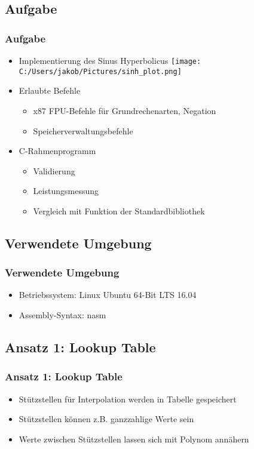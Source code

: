 	\frame{\titlepage}
	\begin{frame}
		\tableofcontents
	\end{frame}
	\begin{frame}
		\section{Aufgabe}
		\frametitle{Aufgabe}
		\begin{itemize}
			\item Implementierung des Sinus Hyperbolicus
			\texttt{[image: C:/Users/jakob/Pictures/sinh\_plot.png]}
			\item Erlaubte Befehle
			\begin{itemize}
				\item x87 FPU-Befehle für Grundrechenarten, Negation
				\item Speicherverwaltungsbefehle
			\end{itemize}
			\item C-Rahmenprogramm
			\begin{itemize}
				\item Validierung
				\item Leistungsmessung 
				\item Vergleich mit Funktion der Standardbibliothek
			\end{itemize}
		\end{itemize}
	\end{frame}
	\begin{frame}
		\section{Verwendete Umgebung}
		\frametitle{Verwendete Umgebung}
		\begin{itemize}
			\item Betriebssystem: Linux Ubuntu 64-Bit LTS 16.04
			\item Assembly-Syntax: nasm
		\end{itemize}
	\end{frame}
	\begin{frame}
		\section{Ansatz 1: Lookup Table}
		\frametitle{Ansatz 1: Lookup Table}
		\begin{itemize}
			\item Stützstellen für Interpolation werden in Tabelle gespeichert
			\item Stützstellen können z.B. ganzzahlige Werte sein
			\item Werte zwischen Stützstellen lassen sich mit Polynom annähern
		\end{itemize}
	\end{frame}
